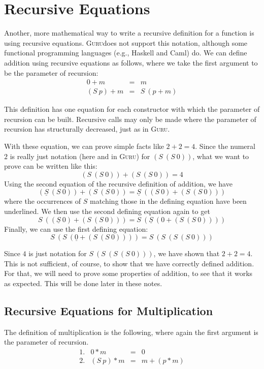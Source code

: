 \documentclass{book}[12pt]
\newcommand{\guru}[0]{\textsc{Guru}}
\begin{document}
\section{Recursive Equations}
\label{sec:receqns}

Another, more mathematical way to write a recursive definition for a
function is using recursive equations.  \guru does not support this
notation, although some functional programming languages (e.g.,
Haskell and Caml) do.  We can define addition using recursive
equations as follows, where we take the first argument to be the
parameter of recursion:
\begin{eqnarray*}
0 + m &=& m \\
(S\ p) + m &=& S\ (p + m)
\end{eqnarray*}

\noindent This definition has one equation for each constructor with
which the parameter of recursion can be built.  Recursive calls may
only be made where the parameter of recursion has structurally
decreased, just as in \guru.

With these equation, we can prove simple facts like $2+2=4$.  Since
the numeral $2$ is really just notation (here and in \guru) for $(S\ (S\ 0))$,
what we want to prove can be written like this:
\[
(S\ (S\ 0)) + (S\ (S\ 0)) = 4
\]
Using the second equation of the recursive definition of addition, we have
\[
(\underline{S}\ (S\ 0)) + (S\ (S\ 0)) = 
\underline{S}\ ((S\ 0) + (S\ (S\ 0)))
\]
where the occurrences of $S$ matching those in the defining equation
have been underlined.  We then use the second defining equation again
to get
\[
S\ ((\underline{S}\ 0) + (S\ (S\ 0))) = 
S\ (\underline{S}\ (0 + (S\ (S\ 0))))
\]
Finally, we can use the first defining equation:
\[
S\ (S\ (\underline{0} + (S\ (S\ 0)))) = S\ (S\ (S\ (S\ 0)))
\]

Since $4$ is just notation for $S\ (S\ (S\ (S\ 0)))$, we have shown
that $2+2=4$.  This is not sufficient, of course, to show that we have
correctly defined addition.  For that, we will need to prove some
properties of addition, to see that it works as expected.  This will
be done later in these notes.

\subsection{Recursive Equations for Multiplication}

The definition of multiplication is the following, where again the
first argument is the parameter of recursion.
\[
\begin{array}{llll}
1. & 0 * m &=& 0 \\
2. & (S\ p) * m &=& m + (p * m)
\end{array}
\]
\end{document}
